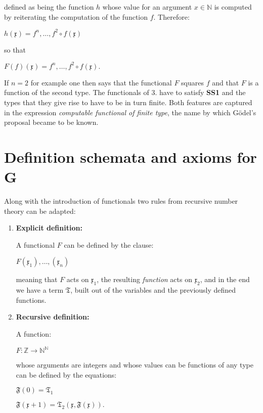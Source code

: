 \documentclass[12pt]{article}
\begin{document}
\begin{enumerate}
defined as being the function $h$ whose value for an argument $x \in \mathbb{N}$ is computed by reiterating the computation of the function $f$. Therefore:

\begin{center}
$h (\mathfrak{x}) = f^n, \ldots, f^2 \circ f (\mathfrak{x})$
\end{center}

so that

\begin{center} 
$F (f) (\mathfrak{x}) = f^n, \ldots, f^2 \circ f (\mathfrak{x}).$
\end{center}

If $n = 2$ for example one then says that the functional $F$ squares $f$ and that $F$ is a function of the second type.
The functionals of 3. have to satisfy \textbf{SS1} and the types that they give rise to have to be in turn finite. Both features are captured in the expression \emph{computable functional of finite type}, the name by which G\"odel's proposal became to be known.

\end{enumerate}

\section{Definition schemata and axioms for G}\normalsize

Along with the introduction of functionals two rules from recursive number theory can be adapted:

\begin{enumerate}
\item \textbf{Explicit definition:}
 
A functional $F$ can be defined by the clause:

\begin{center}
$F (\mathfrak{x}_1), \ldots, (\mathfrak{x}_n)$
\end{center}

meaning that $F$ acts on $\mathfrak{x}_1$, the resulting \emph{function} acts on $\mathfrak{x}_2$, and in the end we have a term $\mathfrak{T}$, built out of the variables and the previously defined functions.

\item \textbf{Recursive definition:}

A function:

\begin{center}
$F : \mathbb{Z} \to \mathbb{N}^{\mathbb{N}}$
\end{center}

whose arguments are integers and whose values can be functions of any type can be defined by the equations:

\begin{center}
$\mathfrak{F} (0) = \mathfrak{T}_1$

$\mathfrak{F} (\mathfrak{x} + 1) = \mathfrak{T}_2 (\mathfrak{x}, \mathfrak{F} (\mathfrak{x})).$
\end{center}

\end{enumerate}
\end{document}
